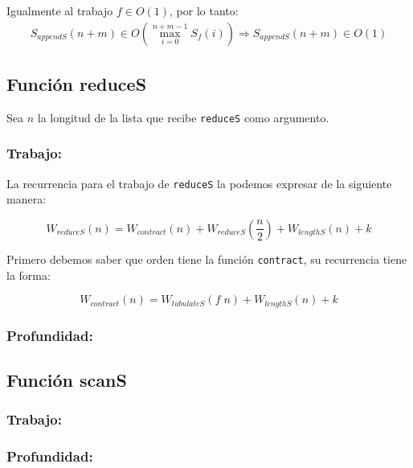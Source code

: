 \documentclass[11pt]{article}
\begin{document}
Igualmente al trabajo $f \in O(1)$, por lo tanto:
\begin{align*}
    S_{appendS}(n + m) \in O\left(\displaystyle\max_{i=0}^{n + m - 1}S_f(i)\right)
    \Rightarrow S_{appendS}(n + m) \in O(1)
\end{align*}


\subsection{Función reduceS}

Sea $n$ la longitud de la lista que recibe \texttt{reduceS} como argumento.

\subsubsection{Trabajo:}

La recurrencia para el trabajo de \texttt{reduceS} la podemos expresar de
la siguiente manera:

\begin{equation*}
    W_{reduceS}(n) = W_{contract}(n) + W_{reduceS}(\frac{n}{2}) + W_{lengthS}(n) + k
\end{equation*}

Primero debemos saber que orden tiene la función \texttt{contract}, su recurrencia
tiene la forma:

\begin{equation*}
    W_{contract}(n) = W_{tabulateS}(f \; n) + W_{lengthS}(n) + k
\end{equation*}

\subsubsection{Profundidad:}


\subsection{Función scanS}
\subsubsection{Trabajo:}

\subsubsection{Profundidad:}
\end{document}
